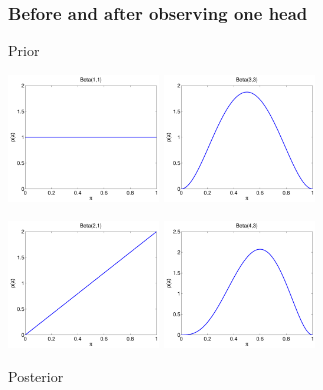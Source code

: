 \begin{frame}
\frametitle{Before and after observing one head}

\centerline{Prior}

\centerline{\includegraphics[width=0.3\textwidth]{Beta11}\hspace{2cm}
\includegraphics[width=0.3\textwidth]{Beta33}}


\centerline{\includegraphics[width=0.3\textwidth]{Beta21}\hspace{2cm}
\includegraphics[width=0.3\textwidth]{Beta43}}

\centerline{Posterior}
\end{frame}

